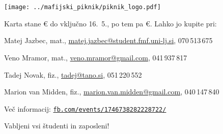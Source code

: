 \documentclass[a4paper,oneside,12pt]{article}
\title{\Title}
\author{\Author}
\date{\today}
\theoremstyle{definition}
\newenvironment{itemize*}{\vspace{-6pt}\begin{itemize}\setlength{\itemsep}{0pt}\setlength{\parskip}{2pt}}{\end{itemize}}
\begin{document}
\vspace*{-10ex}

\begin{center}
\fontsize{64}{64}\selectfont
{}\scalebox{2.6}{$\boldsymbol \varphi$}\textbf{\scalebox{2}{jski piknik}} \\[28px]

\vspace*{1ex}

\fontsize{36}{55}\selectfont
{}\mbox{
 }

\fontsize{32}{36}\selectfont

\vspace*{-0.5ex}
\texttt{[image: ../mafijski\_piknik/piknik\_logo.pdf]}

\vspace{-1ex}
\begin{flushleft}
  Karta stane \unit[10]{\euro} do vključno 16.~5., po tem pa
  \unit[12]{\euro}. Lahko jo kupite pri:
\end{flushleft}
\fontsize{18}{20}\selectfont
\vspace{-3.5ex}
\begin{itemize*}
  \item Matej Jazbec, mat.,
    \href{mailto:matej.jazbec@student.fmf.uni-lj.si}{matej.jazbec@student.fmf.uni-lj.si},
    070\,513\,675
  \item Veno Mramor, mat., \href{mailto:veno.mramor@gmail.com}{veno.mramor@gmail.com}, 041\,937\,817
  \item Tadej Novak, fiz., \href{mailto:tadej@tano.si}{tadej@tano.si}, 051\,220\,552
  \item Marion van Midden, fiz.,
    \href{mailto:marion.van.midden@gmail.com}{marion.van.midden@gmail.com},
    040\,147\,840
\end{itemize*}

\vspace{-2ex}

\fontsize{18}{20}\selectfont
Več informacij:
\href{https://www.facebook.com/events/1746738282228722/}{\texttt{fb.com/events/1746738282228722/}}

\fontsize{36}{36}\selectfont
\vspace*{-1ex}
Vabljeni vsi študenti in zaposleni!

\end{center}
\end{document}
